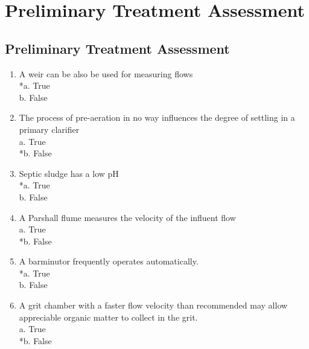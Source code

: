 
\chapter{Preliminary Treatment Assessment}

\section*{Preliminary Treatment Assessment}


\begin{enumerate}

\item A weir can be also be used for measuring flows\\

*a. True \\
b. False 
\vspace{0.4cm}
\item The process of pre-aeration in no way influences the degree of settling in a primary clarifier\\
\vspace{0.4cm}
a. True \\
*b. False 
\vspace{0.4cm}
\item Septic sludge has a low pH\\

*a. True \\
b. False 
\vspace{0.4cm}
\item A Parshall flume measures the velocity of the influent flow\\

a. True \\
*b. False 
\vspace{0.4cm}
\item  A barminutor frequently operates automatically. \\

*a. True \\
b. False 

\vspace{0.4cm}
\item  A grit chamber with a faster flow velocity than recommended may allow appreciable organic matter to collect in the grit. \\

a. True \\
*b. False 


\end{enumerate}
